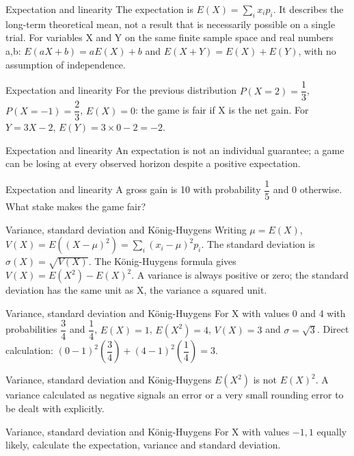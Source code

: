 \documentclass[aspectratio=169,10pt]{beamer}
\begin{document}
\begin{frame}{Expectation and linearity}
The expectation is \(E(X)=\sum_i x_ip_i\). It describes the long-term theoretical mean, not a result that is necessarily possible on a single trial. For variables X and Y on the same finite sample space and real numbers a,b: \(E(aX+b)=aE(X)+b\) and \(E(X+Y)=E(X)+E(Y)\), with no assumption of independence.
\end{frame}
\begin{frame}{Expectation and linearity}
For the previous distribution \(P(X=2)=\dfrac{1}{3}\), \(P(X=-1)=\dfrac{2}{3}\), \(E(X)=0\): the game is fair if X is the net gain. For \(Y=3X-2\), \(E(Y)=3\times0-2=-2\).
\end{frame}
\begin{frame}{Expectation and linearity}
An expectation is not an individual guarantee; a game can be losing at every observed horizon despite a positive expectation.
\end{frame}
\begin{frame}{Expectation and linearity}
A gross gain is 10 with probability \(\dfrac{1}{5}\) and 0 otherwise. What stake makes the game fair?
\end{frame}
\begin{frame}{Variance, standard deviation and König-Huygens}
Writing \(\mu=E(X)\), \(V(X)=E((X-\mu)^2)=\sum_i(x_i-\mu)^2p_i\). The standard deviation is \(\sigma(X)=\sqrt{V(X)}\). The König-Huygens formula gives \(V(X)=E(X^2)-E(X)^2\). A variance is always positive or zero; the standard deviation has the same unit as X, the variance a squared unit.
\end{frame}
\begin{frame}{Variance, standard deviation and König-Huygens}
For X with values 0 and 4 with probabilities \(\dfrac{3}{4}\) and \(\dfrac{1}{4}\), \(E(X)=1\), \(E(X^2)=4\), \(V(X)=3\) and \(\sigma=\sqrt3\). Direct calculation: \((0-1)^2(\dfrac{3}{4})+(4-1)^2(\dfrac{1}{4})=3\).
\end{frame}
\begin{frame}{Variance, standard deviation and König-Huygens}
\(E(X^2)\) is not \(E(X)^2\). A variance calculated as negative signals an error or a very small rounding error to be dealt with explicitly.
\end{frame}
\begin{frame}{Variance, standard deviation and König-Huygens}
For X with values \(-1,1\) equally likely, calculate the expectation, variance and standard deviation.
\end{frame}
\end{document}

